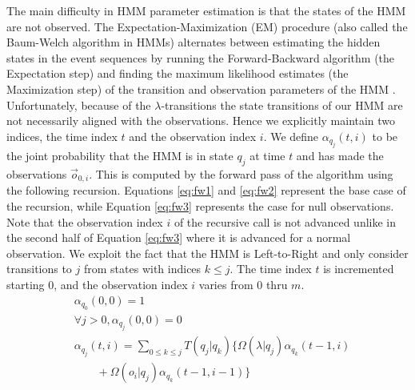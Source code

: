 \documentclass[letterpaper]{article}
\begin{document}
 
The main difficulty in HMM parameter estimation is that the 
states of the HMM are not observed. The Expectation-Maximization  (EM) 
procedure (also called the Baum-Welch algorithm in HMMs) alternates between estimating the hidden states in the event sequences by running the Forward-Backward algorithm (the Expectation step) and finding the maximum likelihood estimates (the Maximization step) of the transition and observation parameters of the HMM \cite{baum1970maximization}. %
Unfortunately, because of the $\lambda$-transitions the state transitions of our HMM are not necessarily aligned with the observations. Hence we 
explicitly maintain two indices, the time index $t$ and the observation index $i$.  We define $\alpha_{q_j}(t,i)$ to be the joint probability that the HMM is in state $q_j$ at time $t$ and has made the observations $\vec{o}_{0,i}$. This is computed by the forward pass of the algorithm using the following recursion. Equations \ref{eq:fw1} and \ref{eq:fw2} represent the base case of the recursion, while Equation \ref{eq:fw3} represents the case for null observations. Note that the observation index $i$ of the recursive call is not advanced unlike in the second half of Equation \ref{eq:fw3} where it is advanced for a normal observation.  We exploit the fact that the HMM is Left-to-Right and only consider transitions to $j$ from states with indices $k \leq j$. The time index $t$ is incremented starting $0$, and the observation index $i$ varies from $0$ thru $m$. %
{\footnotesize
\vspace{-.1in}
\begin{align}
&\alpha_{q_0}(0,0) = 1 \label{eq:fw1}\\
&\forall j > 0, \alpha_{q_j}(0,0) = 0 \label{eq:fw2}\\
&\alpha_{q_j}(t,i) = \sum_{0 \leq k \leq j} T(q_j|q_k) \{\Omega(\lambda|q_j) \alpha_{q_k}(t-1,i) \label{eq:fw3}\\ 
&\qquad + \Omega(o_{i}|q_j) \alpha_{q_k}(t-1,i-1) \} \nonumber
\end{align}
\vspace{-.2in}
}%
\end{document}
